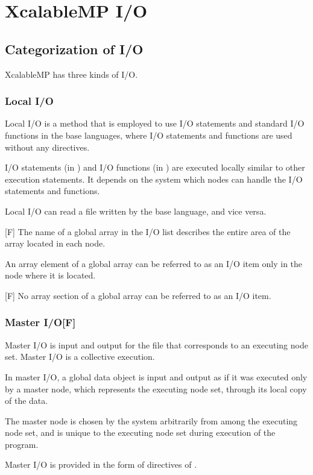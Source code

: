 
 \chapter{XcalableMP I/O}

 \section{Categorization of I/O}
 XcalableMP has three kinds of I/O.

  \subsection{Local I/O}

  Local I/O is a method that is employed to use I/O statements and
  standard I/O functions in the 
  base languages, where I/O statements and functions are used without
  any directives.

  I/O statements (in {\XMP} {\Fort}) and I/O functions (in {\XMP} {\C})
  are executed locally similar to other execution statements.
  It depends on the system which nodes can handle the I/O statements and
  functions.

  Local I/O can read a file written by the base language, and vice
  versa.

  [F] The name of a global array in the I/O list describes the
  entire area of the array located in each node.

  An array element of a global array can be referred to as an I/O item only
  in the node where it is located.

  [F] No array section of a global array can be referred to as an
  I/O item.

  \subsection{Master I/O[F]}

  Master I/O is input and output for the file that corresponds to an
  executing node set.
  Master I/O is a collective execution.

  In master I/O, a global data object is input and output as if it was executed
  only by a master node, which represents the executing node set, through
  its local copy of the data.

  The master node is chosen by the system arbitrarily from among the
  executing node set, and is unique to the executing node set during
  execution of the program.

  Master I/O is provided in the form of directives of {\XMP} {\Fort}.


